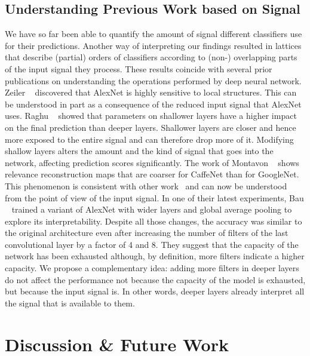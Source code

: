 \documentclass[10pt,twocolumn,a4paper]{article}
\begin{document}
\subsection{Understanding Previous Work based on Signal}
We have so far been able to quantify the amount of signal different classifiers use for their predictions.
Another way of interpreting our findings resulted in lattices that describe (partial) orders of classifiers according to (non-) overlapping parts of the input signal they process.
These results coincide with several prior publications on understanding the operations performed by deep neural network.
Zeiler \etal~\cite{zeiler2014visualizing} discovered that AlexNet is highly sensitive to local structures.
This can be understood in part as a consequence of the reduced input signal that AlexNet uses.
Raghu \etal~\cite{raghu2016expressive} showed that parameters on shallower layers have a higher impact on the final prediction than deeper layers.
Shallower layers are closer and hence more exposed to the entire signal and can therefore drop more of it.
Modifying shallow layers alters the amount and the kind of signal that goes into the network, affecting prediction scores significantly.
The work of Montavon \etal~\cite{montavon2017explaining} shows relevance reconstruction maps that are coarser for CaffeNet than for GoogleNet.
This phenomenon is consistent with other work~\cite{lapuschkin2016analysing} and can now be understood from the point of view of the input signal.
In one of their latest experiments, Bau \etal~\cite{netdissect2017} trained a variant of AlexNet with wider layers and global average pooling to explore its interpretability.
Despite all those changes, the accuracy was similar to the original architecture even after increasing the number of filters of the last convolutional layer by a factor of 4 and 8.
They suggest that the capacity of the network has been exhausted although, by definition, more filters indicate a higher capacity.
We propose a complementary idea: adding more filters in deeper layers do not affect the performance not because the capacity of the model is exhausted, but because the input signal is.
In other words, deeper layers already interpret all the signal that is available to them.



\section{Discussion \& Future Work}
\end{document}

